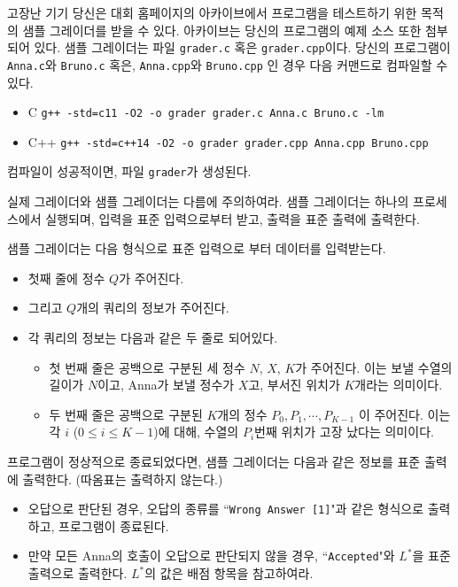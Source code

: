 \begin{problem}{고장난 기기}
	당신은 대회 홈페이지의 아카이브에서 프로그램을 테스트하기 위한 목적의 샘플 그레이더를 받을 수 있다. 아카이브는 당신의 프로그램의 예제 소스 또한 첨부되어 있다.
	샘플 그레이더는 파일 \texttt{grader.c} 혹은 \texttt{grader.cpp}이다. 당신의 프로그램이 \texttt{Anna.c}와 \texttt{Bruno.c} 혹은, \texttt{Anna.cpp}와 \texttt{Bruno.cpp} 인 경우 다음 커맨드로 컴파일할 수 있다.
	
	\begin{itemize}
		\item C
		\texttt{g++ -std=c11 -O2 -o grader grader.c Anna.c Bruno.c -lm}
		\item C++
		\texttt{g++ -std=c++14 -O2 -o grader grader.cpp Anna.cpp Bruno.cpp }
	\end{itemize}
	
	컴파일이 성공적이면, 파일 \texttt{grader}가 생성된다.
	
	실제 그레이더와 샘플 그레이더는 다름에 주의하여라. 샘플 그레이더는 하나의 프로세스에서 실행되며, 입력을 표준 입력으로부터 받고, 출력을 표준 출력에 출력한다.
	
	\InputFile
	
	샘플 그레이더는 다음 형식으로 표준 입력으로 부터 데이터를 입력받는다.
	
	\begin{itemize}
		\item 첫째 줄에 정수 $Q$가 주어진다.
		\item 그리고 $Q$개의 쿼리의 정보가 주어진다.
		\item 각 쿼리의 정보는 다음과 같은 두 줄로 되어있다.
		\begin{itemize}
			\item 첫 번째 줄은 공백으로 구분된 세 정수 $N$, $X$, $K$가 주어진다. 이는 보낼 수열의 길이가 $N$이고, Anna가 보낼 정수가 $X$고, 부서진 위치가 $K$개라는 의미이다.
			\item 두 번째 줄은 공백으로 구분된 $K$개의 정수 $P_0,P_1, \cdots, P_{K-1}$ 이 주어진다. 이는 각 $i$ ($0 \le i \le K-1$)에 대해, 수열의 $P_i$번째 위치가 고장 났다는 의미이다.
		\end{itemize}
	\end{itemize}
	
	
	\OutputFile
	
	프로그램이 정상적으로 종료되었다면, 샘플 그레이더는 다음과 같은 정보를 표준 출력에 출력한다. (따옴표는 출력하지 않는다.)
	
	\begin{itemize}
		\item 오답으로 판단된 경우, 오답의 종류를 ``\texttt{Wrong Answer [1]}"과 같은 형식으로 출력하고, 프로그램이 종료된다.
		\item 만약 모든 Anna의 호출이 오답으로 판단되지 않을 경우,  ``\texttt{Accepted}"와 $L^*$을 표준 출력으로 출력한다. $L^*$의 값은 배점 항목을 참고하여라. 
	\end{itemize}
	

\end{problem}
